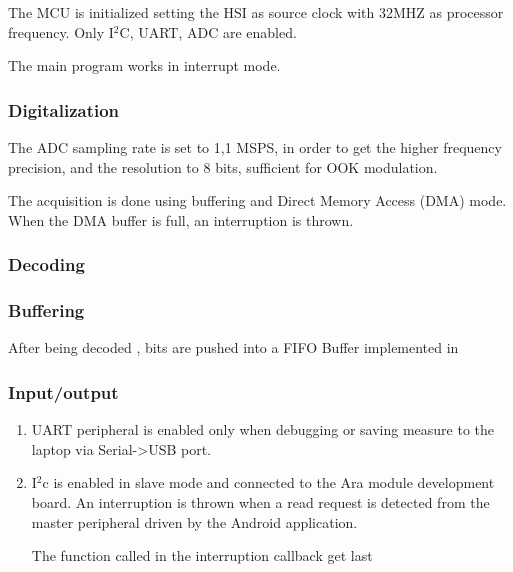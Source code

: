 The MCU is initialized setting the HSI as source clock with 32MHZ as processor frequency. Only I$^2$C, UART, ADC are enabled.

The main program works in interrupt mode. 

\subsubsection{Digitalization}

The ADC sampling rate is set to 1,1 MSPS, in order to get the higher frequency precision, and the resolution to 8 bits, sufficient for OOK modulation.

The acquisition is done using buffering and Direct Memory Access (DMA) mode. 
When the DMA buffer is full, an interruption is thrown. 

\subsubsection{Decoding}


\subsubsection{Buffering}

After being decoded , bits are pushed into a FIFO Buffer implemented in 



\subsubsection{Input/output}
 
\begin{enumerate}
\item UART peripheral is enabled only when debugging or saving measure to the laptop via Serial->USB port.

\item I$^2$c is enabled in slave mode and connected to the Ara module development board. An interruption is thrown when a read request is detected from the master peripheral driven by the Android application.

The function called in the interruption callback get last 
\end{enumerate}


